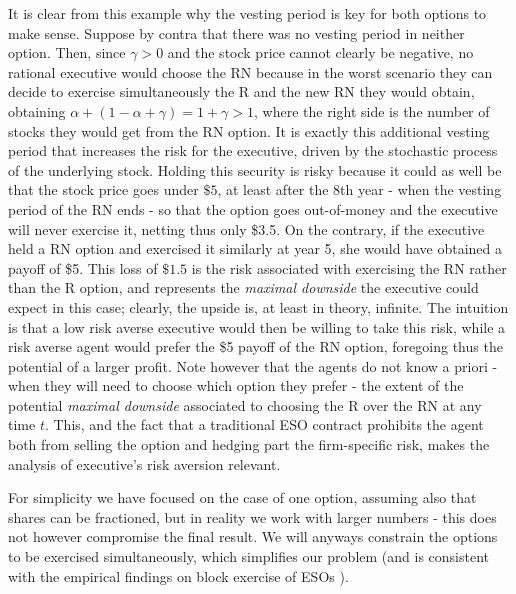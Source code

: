 It is clear from this example why the vesting period is key for both options to make sense. Suppose by contra that there was no vesting period in neither option. Then, since $\gamma > 0$ and the stock price cannot clearly be negative, no rational executive would choose the RN because in the worst scenario they can decide to exercise simultaneously the R and the new RN they would obtain, obtaining $\alpha + (1-\alpha+\gamma)=1+\gamma > 1$, where the right side is the number of stocks they would get from the RN option. It is exactly this additional vesting period that increases the risk for the executive, driven by the stochastic process of the underlying stock. Holding this security is risky because it could as well be that the stock price goes under $\$5$, at least after the 8th year - when the vesting period of the RN ends - so that the option goes out-of-money and the executive will never exercise it, netting thus only \$3.5. On the contrary, if the executive held a RN option and exercised it similarly at year 5, she would have obtained a payoff of \$5. This loss of $\$1.5$ is the risk associated with exercising the RN rather than the R option, and represents the \textit{maximal downside} the executive could expect in this case; clearly, the upside is, at least in theory, infinite. The intuition is that a low risk averse executive would then be willing to take this risk, while a risk averse agent would prefer the \$5 payoff of the RN option, foregoing thus the potential of a larger profit. Note however that the agents do not know a priori - when they will need to choose which option they prefer - the extent of the potential \textit{maximal downside} associated to choosing the R over the RN at any time $t$. This, and the fact that a traditional ESO contract prohibits the agent both from selling the option and hedging part the firm-specific risk, makes the analysis of executive's risk aversion relevant.

For simplicity we have focused on the case of one option, assuming also that shares can be fractioned, but in reality we work with larger numbers - this does not however compromise the final result. We will anyways constrain the options to be exercised simultaneously, which simplifies our problem (and is consistent with the empirical findings on block exercise of ESOs%
). 



